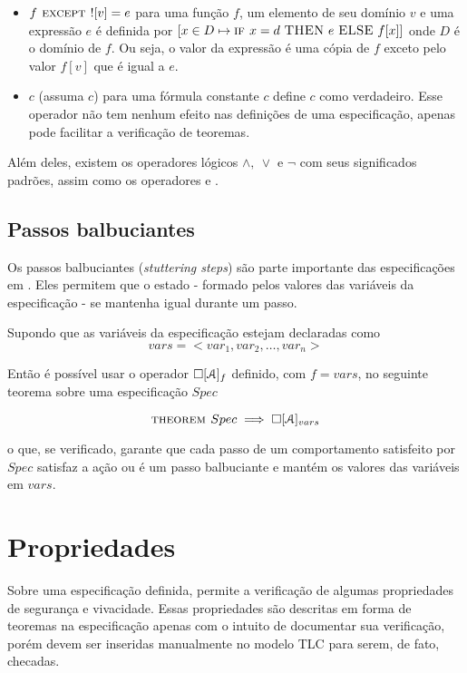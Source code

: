 \begin{itemize}
  \item $f \textsc{ except } ![v] = e$ para uma função $f$, um elemento de seu domínio $v$ e uma expressão $e$ é definida por $[x \in D \mapsto \IF x = d\ \textsc{THEN}\ e\ \textsc{ELSE}\ f[x]]$ onde $D$ é o domínio de $f$. Ou seja, o valor da expressão \EXCEPT é uma cópia de $f$ exceto pelo valor $f[v]$ que é igual a $e$.

  \item \ASSUME $c$ (assuma $c$) para uma fórmula constante $c$ define $c$ como verdadeiro. Esse operador não tem nenhum efeito nas definições de uma especificação, apenas pode facilitar a verificação de teoremas.
\end{itemize}

Além deles, existem os operadores lógicos $\land,\ \lor$ e $\neg$ com seus significados padrões, assim como os operadores \IF e \CASE.

\subsection{Passos balbuciantes}

Os passos balbuciantes (\textit{stuttering steps}) são parte importante das especificações em \TLA. Eles permitem que o estado - formado pelos valores das variáveis da especificação - se mantenha igual durante um passo.

Supondo que as variáveis da especificação estejam declaradas como
\[vars = <var_1, var_2, \dots, var_n>\]

Então é possível usar o operador $\square [\textbf{$\mathcal{A}$}]_f$ definido, com $f = vars$, no seguinte teorema sobre uma especificação $Spec$

\[\textsc{theorem } Spec \implies \square [\textbf{$\mathcal{A}$}]_{vars}\]

o que, se verificado, garante que cada passo de um comportamento satisfeito por $Spec$ satisfaz a ação \FANCYA ou é um passo balbuciante e mantém os valores das variáveis em $vars$.

\section{Propriedades}

Sobre uma especificação definida, \TLA permite a verificação de algumas propriedades de segurança e vivacidade. Essas propriedades são descritas em forma de teoremas na especificação apenas com o intuito de documentar sua verificação, porém devem ser inseridas manualmente no modelo TLC para serem, de fato, checadas.

